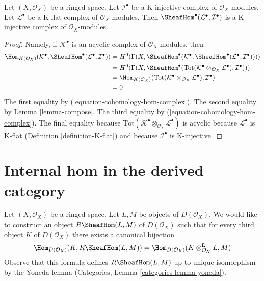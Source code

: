 \begin{lemma}
\label{lemma-RHom-from-K-flat-into-K-injective}
Let $(X, \mathcal{O}_X)$ be a ringed space. Let $\mathcal{I}^\bullet$
be a K-injective complex of $\mathcal{O}_X$-modules. Let
$\mathcal{L}^\bullet$ be a K-flat complex of $\mathcal{O}_X$-modules.
Then $\SheafHom^\bullet(\mathcal{L}^\bullet, \mathcal{I}^\bullet)$
is a K-injective complex of $\mathcal{O}_X$-modules.
\end{lemma}

\begin{proof}
Namely, if $\mathcal{K}^\bullet$ is an acyclic complex of
$\mathcal{O}_X$-modules, then
\begin{align*}
\Hom_{K(\mathcal{O}_X)}(\mathcal{K}^\bullet,
\SheafHom^\bullet(\mathcal{L}^\bullet, \mathcal{I}^\bullet))
& =
H^0(\Gamma(X,
\SheafHom^\bullet(\mathcal{K}^\bullet,
\SheafHom^\bullet(\mathcal{L}^\bullet, \mathcal{I}^\bullet)))) \\
& =
H^0(\Gamma(X, \SheafHom^\bullet(\text{Tot}(
\mathcal{K}^\bullet \otimes_{\mathcal{O}_X} \mathcal{L}^\bullet),
\mathcal{I}^\bullet))) \\
& =
\Hom_{K(\mathcal{O}_X)}(
\text{Tot}(\mathcal{K}^\bullet \otimes_{\mathcal{O}_X} \mathcal{L}^\bullet),
\mathcal{I}^\bullet) \\
& =
0
\end{align*}
The first equality by (\ref{equation-cohomology-hom-complex}).
The second equality by Lemma \ref{lemma-compose}.
The third equality by (\ref{equation-cohomology-hom-complex}).
The final equality because
$\text{Tot}(\mathcal{K}^\bullet \otimes_{\mathcal{O}_X} \mathcal{L}^\bullet)$
is acyclic because $\mathcal{L}^\bullet$ is K-flat
(Definition \ref{definition-K-flat}) and because $\mathcal{I}^\bullet$
is K-injective.
\end{proof}








\section{Internal hom in the derived category}
\label{section-internal-hom}

\noindent
Let $(X, \mathcal{O}_X)$ be a ringed space. Let $L, M$ be objects
of $D(\mathcal{O}_X)$. We would like to construct an object
$R\SheafHom(L, M)$ of $D(\mathcal{O}_X)$ such that for every third
object $K$ of $D(\mathcal{O}_X)$ there exists a canonical bijection
\begin{equation}
\label{equation-internal-hom}
\Hom_{D(\mathcal{O}_X)}(K, R\SheafHom(L, M))
=
\Hom_{D(\mathcal{O}_X)}(K \otimes_{\mathcal{O}_X}^\mathbf{L} L, M)
\end{equation}
Observe that this formula defines $R\SheafHom(L, M)$ up to unique
isomorphism by the Yoneda lemma
(Categories, Lemma \ref{categories-lemma-yoneda}).

